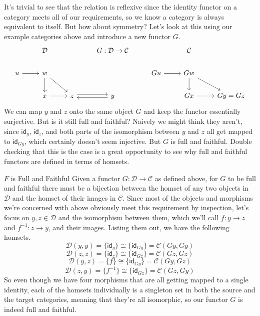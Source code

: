 \documentclass[12pt]{article}
\newcounter{examp}
\begin{document}
It's trivial to see that the relation is reflexive since the identity functor on a category meets all of our requirements, so we know a category is always equivalent to itself.
But how about symmetry?
Let's look at this using our example categories above and introduce a new functor $G$.
\[\begin{tikzcd}
        & {\mathcal{D}} && {G:\mathcal{D}\rightarrow\mathcal{C}} && {\mathcal{C}} \\
        u & w &&& Gu & Gw \\
        & x & z & y && Gx & {Gy=Gz}
        \arrow[from=2-1, to=2-2]
        \arrow[from=2-2, to=3-2]
        \arrow[from=3-2, to=3-3]
        \arrow[from=2-2, to=3-3]
        \arrow[from=2-5, to=2-6]
        \arrow[from=2-6, to=3-6]
        \arrow[from=2-6, to=3-7]
        \arrow[from=3-6, to=3-7]
        \arrow[shift left, from=3-3, to=3-4]
        \arrow[shift left, from=3-4, to=3-3]
    \end{tikzcd}\]
We can map $y$ and $z$ onto the same object $G$ and keep the functor essentially surjective.
But is it still full and faithful?
Naively we might think they aren't, since $\mathsf{id}_y$, $\mathsf{id}_z$, and both parts of the isomorphism between $y$ and $z$ all get mapped to $\mathsf{id}_{Gy}$, which certainly doesn't seem injective.
But $G$ is full and faithful.
Double checking that this is the case is a great opportunity to see why full and faithful functors are defined in terms of homsets.
\begin{proofbox}{$F$ is Full and Faithful}{}
    Given a functor $G: \mathcal{D} \rightarrow \mathcal{C}$ as defined above, for $G$ to be full and faithful there must be a bijection between the homset of any two objects in $\mathcal{D}$ and the homset of their images in $\mathcal{C}$.
    Since most of the objects and morphisms we're concerned with above obviously meet this requirement by inspection, let's focus on $y,z \in \mathcal{D}$ and the isomorphism between them, which we'll call $f:y\rightarrow z$ and $f^{-1}:z\rightarrow y$, and their images.
    Listing them out, we have the following homsets.
    $$\mathcal{D}(y, y) = \{\mathsf{id}_y\} \cong \{\mathsf{id}_{Gy}\} = \mathcal{C}(Gy, Gy)$$
    $$\mathcal{D}(z, z) = \{\mathsf{id}_z\} \cong \{\mathsf{id}_{Gz}\} = \mathcal{C}(Gz, Gz)$$
    $$\mathcal{D}(y, z) = \{f\} \cong \{\mathsf{id}_{Gy}\} = \mathcal{C}(Gy, Gz)$$
    $$\mathcal{D}(z, y) = \{f^{-1}\} \cong \{\mathsf{id}_{Gz}\} = \mathcal{C}(Gz, Gy)$$
    So even though we have four morphisms that are all getting mapped to a single identity, each of the homsets individually is a singleton set in both the source and the target categories, meaning that they're all isomorphic, so our functor $G$ is indeed full and faithful.
\end{proofbox}
\end{document}
